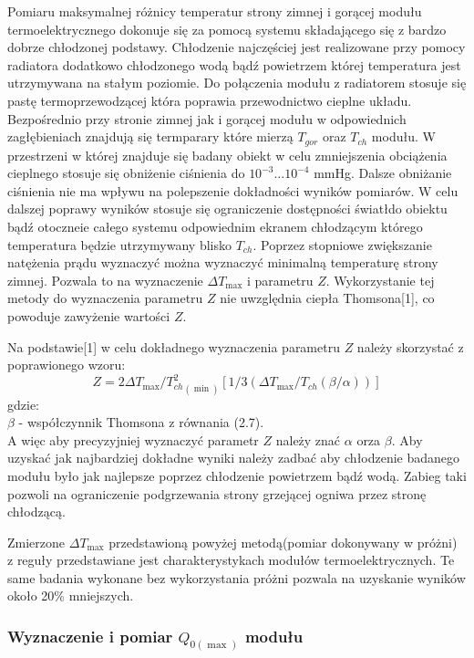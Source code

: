 \documentclass[oneside]{mgr}
\begin{document}
Pomiaru maksymalnej różnicy temperatur strony zimnej i gorącej modułu termoelektrycznego dokonuje się za pomocą systemu składającego się z bardzo dobrze chłodzonej podstawy. Chłodzenie najczęściej jest realizowane przy pomocy radiatora dodatkowo chłodzonego wodą bądź powietrzem której temperatura jest utrzymywana na stałym poziomie. Do połączenia modułu z radiatorem stosuje się pastę termoprzewodzącej która poprawia przewodnictwo cieplne układu. Bezpośrednio przy stronie zimnej jak i gorącej modułu w odpowiednich zagłębieniach znajdują się termparary które mierzą $T_{gor}$ oraz $T_{ch}$ modułu. W przestrzeni w której znajduje się badany obiekt w celu zmniejszenia obciążenia cieplnego stosuje się obniżenie ciśnienia do $10^{-3} \dots 10^{-4}$ mmHg. Dalsze obniżanie ciśnienia nie ma wpływu na polepszenie dokładności wyników pomiarów. W celu dalszej poprawy wyników stosuje się ograniczenie dostępności światłdo obiektu bądź otoczneie całego systemu odpowiednim ekranem chłodzącym którego temperatura będzie utrzymywany blisko $T_{ch}$. Poprzez stopniowe zwiększanie natężenia prądu wyznaczyć można wyznaczyć minimalną temperaturę strony zimnej. Pozwala to na wyznaczenie $\Delta T_{\max}$ i parametru $Z$. Wykorzystanie tej metody do wyznaczenia parametru $Z$ nie uwzględnia ciepła Thomsona[1], co powoduje zawyżenie wartości $Z$.

Na podstawie[1] w celu dokładnego wyznaczenia parametru $Z$ należy skorzystać z poprawionego wzoru:
\begin{equation}
    Z = 2 \Delta T_{\max}/{T_{ch}^2}_{(\min)}[1/3(\Delta T_{\max}/T_{ch}(\beta/\alpha))]
\end{equation}
gdzie:\\
$\beta$ - współczynnik Thomsona z równania (2.7). \\

A więc aby precyzyjniej wyznaczyć parametr $Z$ należy znać $\alpha$ orza $\beta$. Aby uzyskać jak najbardziej dokładne wyniki należy zadbać aby chłodzenie badanego modułu było jak najlepsze poprzez chłodzenie powietrzem bądź wodą. Zabieg taki pozwoli na ograniczenie podgrzewania strony grzejącej ogniwa przez stronę chłodzącą.

Zmierzone $\Delta T_{\max}$ przedstawioną powyżej metodą(pomiar dokonywany w próżni) z reguły przedstawiane jest charakterystykach modułów termoelektrycznych. Te same badania wykonane bez wykorzystania próżni pozwala na uzyskanie wyników około 20\% mniejszych.

\subsubsection{Wyznaczenie i pomiar $Q_{0(\max)}$ modułu}
\end{document}
